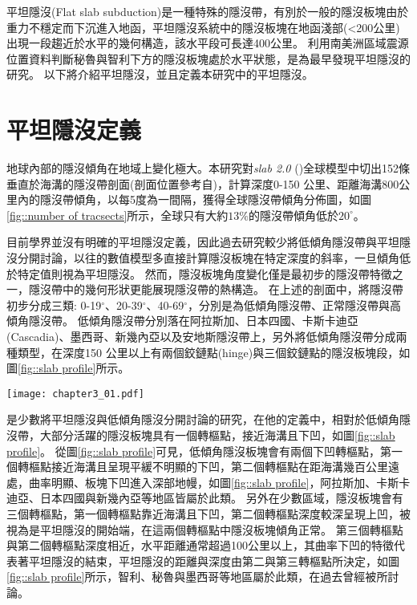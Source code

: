平坦隱沒(Flat slab subduction)是一種特殊的隱沒帶，有別於一般的隱沒板塊由於重力不穩定而下沉進入地函，平坦隱沒系統中的隱沒板塊在地函淺部(<200公里)出現一段趨近於水平的幾何構造，該水平段可長達400公里。
\citealp{barazangi1976}利用南美洲區域震源位置資料判斷秘魯與智利下方的隱沒板塊處於水平狀態，是為最早發現平坦隱沒的研究。
以下將介紹平坦隱沒，並且定義本研究中的平坦隱沒。

\section{平坦隱沒定義}\label{平坦隱沒定義}

地球內部的隱沒傾角在地域上變化極大。本研究對\textsl{slab 2.0} (\citealp{hayes2018slab2})全球模型中切出152條垂直於海溝的隱沒帶剖面(剖面位置參考自\citealp{Hu2020})，計算深度0-150 公里、距離海溝800公里內的隱沒帶傾角，以每5度為一間隔，獲得全球隱沒帶傾角分佈圖，如圖\ref{fig::number of tracsects}所示，全球只有大約$13\%$的隱沒帶傾角低於$20^\circ$。

目前學界並沒有明確的平坦隱沒定義，因此過去研究較少將低傾角隱沒帶與平坦隱沒分開討論，以往的數值模型多直接計算隱沒板塊在特定深度的斜率，一旦傾角低於特定值則視為平坦隱沒。
然而，隱沒板塊角度變化僅是最初步的隱沒帶特徵之一，隱沒帶中的幾何形狀更能展現隱沒帶的熱構造。
在上述的剖面中，將隱沒帶初步分成三類: 0-19$^\circ$、20-39$^\circ$、40-69$^\circ$，分別是為低傾角隱沒帶、正常隱沒帶與高傾角隱沒帶。
低傾角隱沒帶分別落在阿拉斯加、日本四國、卡斯卡迪亞(Cascadia)、墨西哥、新幾內亞以及安地斯隱沒帶上，\citealp{schellart2020control}另外將低傾角隱沒帶分成兩種類型，在深度150 公里以上有兩個鉸鏈點(hinge)與三個鉸鏈點的隱沒板塊段，如圖\ref{fig::slab profile}所示。

\begin{figure*}[ht!]
    \centering
    \texttt{[image: chapter3\_01.pdf]}
    \caption[全球$152$條隱沒帶剖面傾角長條分布圖]{全球$152$條隱沒帶剖面傾角長條分布圖，其中綠底為隱沒剖面傾角低於$20^\circ$的剖面個數，佔整體$13\%$;粉紅底為剖面傾角介於$20^\circ-39^\circ$之間的剖面個數，佔整體$73\%$，粉藍底則為剖面傾角高於$40^\circ$的剖面個數，佔總體$14\%$。}
    \label{fig::number of tracsects}
\end{figure*}

\citealp{schellart2020control}是少數將平坦隱沒與低傾角隱沒分開討論的研究，在他的定義中，相對於低傾角隱沒帶，大部分活躍的隱沒板塊具有一個轉樞點，接近海溝且下凹，如圖\ref{fig::slab profile}。
從圖\ref{fig::slab profile}可見，低傾角隱沒板塊會有兩個下凹轉樞點，第一個轉樞點接近海溝且呈現平緩不明顯的下凹，第二個轉樞點在距海溝幾百公里遠處，曲率明顯、板塊下凹進入深部地幔，如圖\ref{fig::slab profile}，阿拉斯加、卡斯卡迪亞、日本四國與新幾內亞等地區皆屬於此類。
另外在少數區域，隱沒板塊會有三個轉樞點，第一個轉樞點靠近海溝且下凹，第二個轉樞點深度較深呈現上凹，被視為是平坦隱沒的開始端，在這兩個轉樞點中隱沒板塊傾角正常。
第三個轉樞點與第二個轉樞點深度相近，水平距離通常超過100公里以上，其曲率下凹的特徵代表著平坦隱沒的結束，平坦隱沒的距離與深度由第二與第三轉樞點所決定，如圖\ref{fig::slab profile}所示，智利、秘魯與墨西哥等地區屬於此類，在過去曾經被\citealp{Manea2017}所討論。


